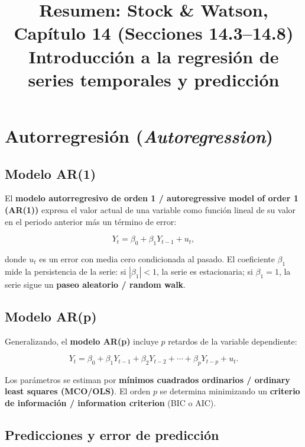 \documentclass[12pt]{article}
\title{\textbf{Resumen: Stock \& Watson, Cap\'itulo 14 (Secciones 14.3--14.8)}\\
\large Introducci\'on a la regresi\'on de series temporales y predicci\'on}
\author{}
\date{}
\begin{document}
\maketitle
\tableofcontents
\newpage

\section{Autorregresión (\textit{Autoregression})}

\subsection{Modelo AR(1)}

El \textbf{modelo autorregresivo de orden 1 / autoregressive model of order 1 (AR(1))} expresa el valor actual de una variable como función lineal de su valor en el periodo anterior más un t\'ermino de error:

\begin{equation}
  Y_t = \beta_0 + \beta_1 Y_{t-1} + u_t,
\end{equation}

donde $u_t$ es un error con media cero condicionada al pasado. El coeficiente $\beta_1$ mide la persistencia de la serie: si $|\beta_1| < 1$, la serie es estacionaria; si $\beta_1 = 1$, la serie sigue un \textbf{paseo aleatorio / random walk}.

\subsection{Modelo AR(p)}

Generalizando, el \textbf{modelo AR(p)} incluye $p$ retardos de la variable dependiente:

\begin{equation}
  Y_t = \beta_0 + \beta_1 Y_{t-1} + \beta_2 Y_{t-2} + \cdots + \beta_p Y_{t-p} + u_t.
\end{equation}

Los par\'ametros se estiman por \textbf{m\'inimos cuadrados ordinarios / ordinary least squares (MCO/OLS)}. El orden $p$ se determina minimizando un \textbf{criterio de informaci\'on / information criterion} (BIC o AIC).

\subsection{Predicciones y error de predicción}
\end{document}
